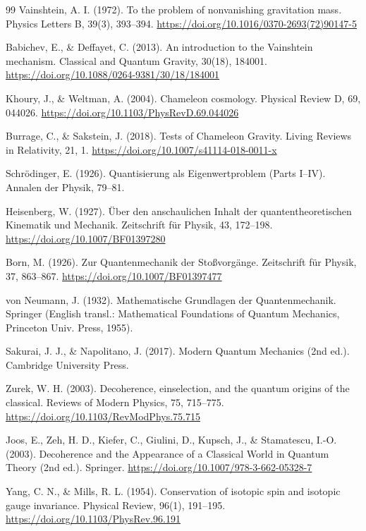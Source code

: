 \begin{thebibliography}{99}
		Vainshtein, A. I. (1972). To the problem of nonvanishing gravitation mass. Physics Letters B, 39(3), 393–394. \url{https://doi.org/10.1016/0370-2693(72)90147-5}
		
		Babichev, E., \& Deffayet, C. (2013). An introduction to the Vainshtein mechanism. Classical and Quantum Gravity, 30(18), 184001. \url{https://doi.org/10.1088/0264-9381/30/18/184001}
		
		Khoury, J., \& Weltman, A. (2004). Chameleon cosmology. Physical Review D, 69, 044026. \url{https://doi.org/10.1103/PhysRevD.69.044026}
		
		Burrage, C., \& Sakstein, J. (2018). Tests of Chameleon Gravity. Living Reviews in Relativity, 21, 1. \url{https://doi.org/10.1007/s41114-018-0011-x}
		
		Schrödinger, E. (1926). Quantisierung als Eigenwertproblem (Parts I–IV). Annalen der Physik, 79–81.
		
		Heisenberg, W. (1927). Über den anschaulichen Inhalt der quantentheoretischen Kinematik und Mechanik. Zeitschrift für Physik, 43, 172–198. \url{https://doi.org/10.1007/BF01397280}
		
		Born, M. (1926). Zur Quantenmechanik der Stoßvorgänge. Zeitschrift für Physik, 37, 863–867. \url{https://doi.org/10.1007/BF01397477}
		
		von Neumann, J. (1932). Mathematische Grundlagen der Quantenmechanik. Springer (English transl.: Mathematical Foundations of Quantum Mechanics, Princeton Univ. Press, 1955).
		
		Sakurai, J. J., \& Napolitano, J. (2017). Modern Quantum Mechanics (2nd ed.). Cambridge University Press.
		
		Zurek, W. H. (2003). Decoherence, einselection, and the quantum origins of the classical. Reviews of Modern Physics, 75, 715–775. \url{https://doi.org/10.1103/RevModPhys.75.715}
		
		Joos, E., Zeh, H. D., Kiefer, C., Giulini, D., Kupsch, J., \& Stamatescu, I.-O. (2003). Decoherence and the Appearance of a Classical World in Quantum Theory (2nd ed.). Springer. \url{https://doi.org/10.1007/978-3-662-05328-7}
		
		Yang, C. N., \& Mills, R. L. (1954). Conservation of isotopic spin and isotopic gauge invariance. Physical Review, 96(1), 191–195. \url{https://doi.org/10.1103/PhysRev.96.191}
		

\end{thebibliography}
